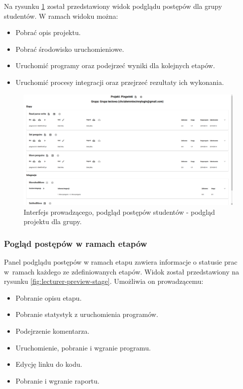 Na rysunku \ref{fig:lecturer-interface-preview} został przedstawiony widok podglądu postępów dla grupy studentów.
W ramach widoku można:
\begin{itemize}
    \item Pobrać opis projektu.
    \item Pobrać środowisko uruchomieniowe.
    \item Uruchomić programy oraz podejrzeć wyniki dla kolejnych etapów.
    \item Uruchomić procesy integracji oraz przejrzeć rezultaty ich wykonania.
\end{itemize}

\begin{figure}[h]
    \centering
    \includegraphics[width = 15cm]{chapter04/lecturer_interface_preview.png}
    \caption{Interfejs prowadzącego, podgląd postępów studentów - podgląd projektu dla grupy.}
    \label{fig:lecturer-interface-preview}
\end{figure}


\subsubsection{Pogląd postępów w ramach etapów}

Panel podglądu postępów w ramach etapu zawiera informacje o statusie prac w~ramach każdego ze zdefiniowanych etapów.
Widok został przedstawiony na rysunku \ref{fig:lecturer-preview-stage}.
Umożliwia on prowadzącemu:
\begin {itemize}
    \item Pobranie opisu etapu.
    \item Pobranie statystyk z uruchomienia programów.
    \item Podejrzenie komentarza.
    \item Uruchomienie, pobranie i wgranie programu.
    \item Edycję linku do kodu.
    \item Pobranie i wgranie raportu.
\end {itemize}


